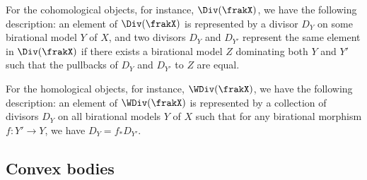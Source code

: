 For the cohomological objects, for instance, $\Div(\frakX)$, we have the following description:
an element of $\Div(\frakX)$ is represented by a divisor $D_Y$ on some birational model $Y$ of $X$, and two divisors $D_Y$ and $D_{Y'}$ represent the same element in $\Div(\frakX)$ if there exists a birational model $Z$ dominating both $Y$ and $Y'$ such that the pullbacks of $D_Y$ and $D_{Y'}$ to $Z$ are equal.

For the homological objects, for instance, $\WDiv(\frakX)$, we have the following description:
an element of $\WDiv(\frakX)$ is represented by a collection of divisors $D_Y$ on all birational models $Y$ of $X$ such that for any birational morphism $f: Y' \to Y$, we have $D_{Y} = f_* D_{Y'}$.











\subsection{Convex bodies}

